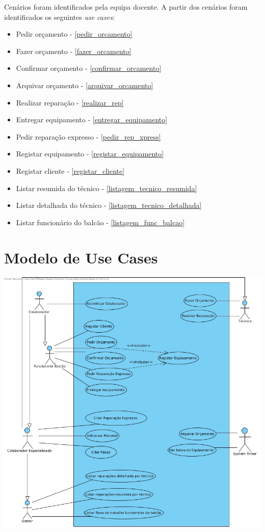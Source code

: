 \documentclass[a4paper,12pt]{scrreprt}
\begin{document}
Cenários foram identificados pela equipa docente.
A partir dos cenários foram identificados os seguintes \textit{use cases}:
\begin{itemize}
        \item Pedir orçamento - \ref{pedir_orcamento}
        \item Fazer orçamento - \ref{fazer_orcamento}
        \item Confirmar orçamento - \ref{confirmar_orcamento}
        \item Arquivar orçamento - \ref{arquivar_orcamento}
        \item Realizar reparação - \ref{realizar_rep}
        \item Entregar equipamento - \ref{entregar_equipamento}
        \item Pedir reparação expresso - \ref{pedir_rep_xpress}
        \item Registar equipamento - \ref{registar_equipamento}
        \item Registar cliente - \ref{registar_cliente}
        \item Listar resumida do técnico - \ref{listagem_tecnico_resumida}
        \item Listar detalhada do técnico - \ref{listagem_tecnico_detalhada}
        \item Listar funcionário do balcão - \ref{listagem_func_balcao}
\end{itemize}
\section{Modelo de Use Cases}

\includegraphics[scale=0.45]{dss-usecase.jpg}
\end{document}
